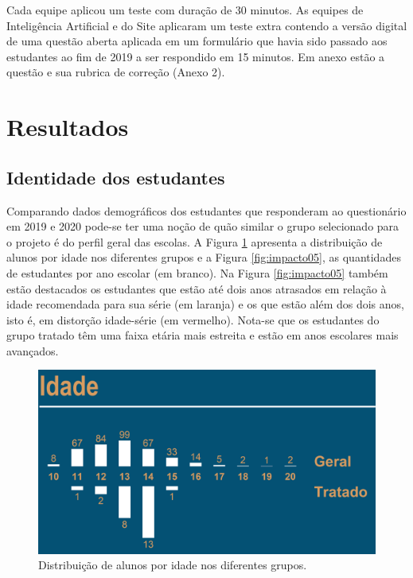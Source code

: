\documentclass[
]{book}
\begin{document}
Cada equipe aplicou um teste com duração de 30 minutos. As equipes de Inteligência Artificial e do Site aplicaram um teste extra contendo a versão digital de uma questão aberta aplicada em um formulário que havia sido passado aos estudantes ao fim de 2019 a ser respondido em 15 minutos. Em anexo estão a questão e sua rubrica de correção (Anexo 2).

\hypertarget{resultados}{%
\section{Resultados}\label{resultados}}

\hypertarget{identidade-dos-estudantes}{%
\subsection{Identidade dos estudantes}\label{identidade-dos-estudantes}}

Comparando dados demográficos dos estudantes que responderam ao questionário em 2019 e 2020 pode-se ter uma noção de quão similar o grupo selecionado para o projeto é do perfil geral das escolas. A Figura \ref{fig:impacto04} apresenta a distribuição de alunos por idade nos diferentes grupos e a Figura \ref{fig:impacto05}, as quantidades de estudantes por ano escolar (em branco). Na Figura \ref{fig:impacto05} também estão destacados os estudantes que estão até dois anos atrasados em relação à idade recomendada para sua série (em laranja) e os que estão além dos dois anos, isto é, em distorção idade-série (em vermelho). Nota-se que os estudantes do grupo tratado têm uma faixa etária mais estreita e estão em anos escolares mais avançados.

\begin{figure}

{\centering \includegraphics[width=0.75\linewidth,height=0.75\textheight]{images/Impactos/04} 

}

\caption{Distribuição de alunos por idade nos diferentes grupos.}\label{fig:impacto04}
\end{figure}
\end{document}
